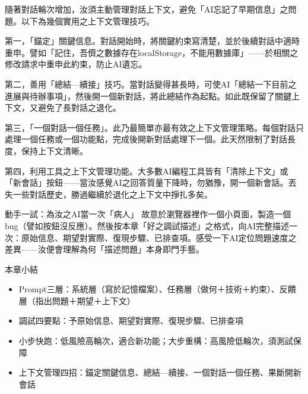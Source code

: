 
隨著對話輪次增加，汝須主動管理對話上下文，避免「AI忘記了早期信息」之問題。以下為幾個實用之上下文管理技巧。

第一，「錨定」關鍵信息。對話開始時，將關鍵約束寫清楚，並於後續對話中適時重申。譬如「記住，吾儕之數據存在localStorage，不能用數據庫」——於相關之修改請求中重申此約束，防止AI遺忘。

第二，善用「總結—續接」技巧。當對話變得甚長時，可使AI「總結一下目前之進展與待辦事項」，然後開一個新對話，將此總結作為起點。如此既保留了關鍵上下文，又避免了長對話之退化。

第三，「一個對話一個任務」。此乃最簡單亦最有效之上下文管理策略。每個對話只處理一個任務或一個功能點，完成後開新對話處理下一個。此天然限制了對話長度，保持上下文清晰。

第四，利用工具之上下文管理功能。大多數AI編程工具皆有「清除上下文」或「新會話」按鈕——當汝感覺AI之回答質量下降時，勿猶豫，開一個新會話。丟失一些對話歷史，勝過繼續於退化之上下文中掙扎多矣。

\begin{tcbpractice}{動手一試：為汝之AI當一次「病人」}
故意於瀏覽器裡作一個小頁面，製造一個bug（譬如按鈕沒反應）。然後按本章「好之調試描述」之格式，向AI完整描述一次：原始信息、期望對實際、復現步驟、已排查項。感受一下AI定位問題速度之差異——汝便會理解為何「描述問題」本身即門手藝。

\end{tcbpractice}

\begin{tcbsummary}{本章小結}
\begin{itemize}
  \item Prompt三層：系統層（寫於記憶檔案）、任務層（做何＋技術＋約束）、反饋層（指出問題＋期望＋上下文）
  \item 調試四要點：予原始信息、期望對實際、復現步驟、已排查項
  \item 小步快跑：低風險高輪次，適合新功能；大步重構：高風險低輪次，須測試保障
  \item 上下文管理四招：錨定關鍵信息、總結—續接、一個對話一個任務、果斷開新會話
\end{itemize}

\end{tcbsummary}
